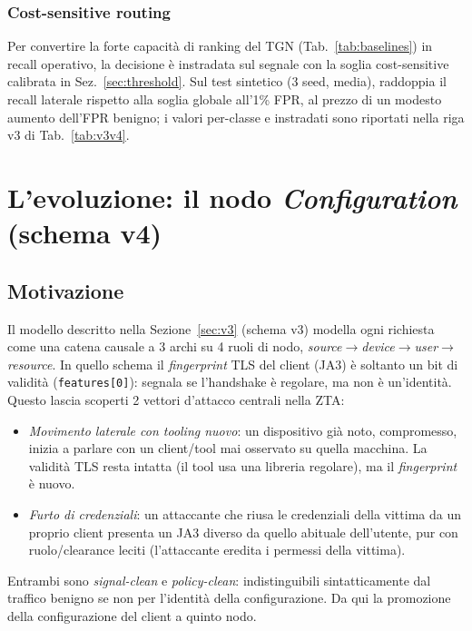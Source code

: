 \subsubsection{Cost-sensitive routing}

Per convertire la forte capacità di ranking del TGN (Tab.~\ref{tab:baselines}) in recall operativo, la decisione è instradata sul segnale con la soglia cost-sensitive calibrata in Sez.~\ref{sec:threshold}. Sul test sintetico (3 seed, media), raddoppia il recall laterale rispetto alla soglia globale all'1\% FPR, al prezzo di un modesto aumento dell'FPR benigno; i valori per-classe e instradati sono riportati nella riga v3 di Tab.~\ref{tab:v3v4}.

\section{L'evoluzione: il nodo \textit{Configuration} (schema v4)}
\label{sec:v4}

\subsection{Motivazione}

Il modello descritto nella Sezione~\ref{sec:v3} (schema v3) modella ogni richiesta come una catena causale a 3 archi su 4 ruoli di nodo, \textit{source}$\rightarrow$\textit{device}$\rightarrow$\textit{user}$\rightarrow$\textit{resource}. In quello schema il \textit{fingerprint} TLS del client (JA3) è soltanto un bit di validità (\texttt{features[0]}): segnala se l'handshake è regolare, ma non è un'identità. Questo lascia scoperti 2 vettori d'attacco centrali nella ZTA:
\begin{itemize}
    \item \textit{Movimento laterale con tooling nuovo}: un dispositivo già noto, compromesso, inizia a parlare con un client/tool mai osservato su quella macchina. La validità TLS resta intatta (il tool usa una libreria regolare), ma il \emph{fingerprint} è nuovo.
    \item \textit{Furto di credenziali}: un attaccante che riusa le credenziali della vittima da un proprio client presenta un JA3 diverso da quello abituale dell'utente, pur con ruolo/clearance leciti (l'attaccante eredita i permessi della vittima).
\end{itemize}
Entrambi sono \emph{signal-clean} e \emph{policy-clean}: indistinguibili sintatticamente dal traffico benigno se non per l'identità della configurazione. Da qui la promozione della configurazione del client a quinto nodo.

